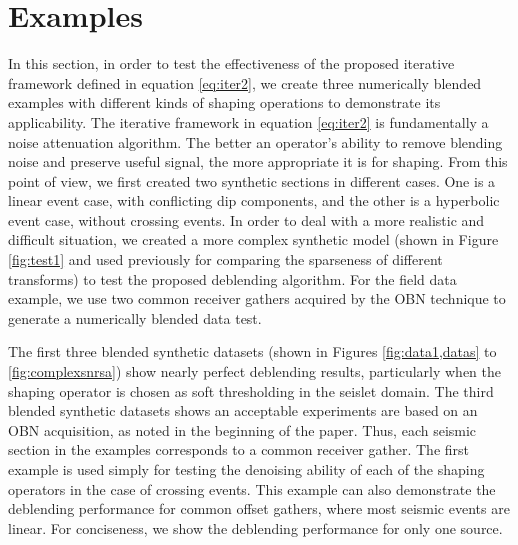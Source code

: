 
\section{Examples}
In this section, in order to test the effectiveness of the proposed iterative framework defined in equation \ref{eq:iter2}, we create three numerically blended examples with different kinds of shaping operations to demonstrate its applicability. The iterative framework in equation \ref{eq:iter2} is fundamentally a noise attenuation algorithm. The better an operator's ability to remove blending noise and preserve useful signal, the more appropriate it is for shaping. From this point of view, we first created two synthetic sections in different cases. One is a linear event case, with conflicting dip components, and the other is a hyperbolic event case, without crossing events. In order to deal with a more realistic and difficult situation, we created a more complex synthetic model (shown in Figure \ref{fig:test1} and used previously for comparing the sparseness of different transforms) to test the proposed deblending algorithm. For the field data example, we use two common receiver gathers acquired by the OBN technique to generate a numerically blended data test. 

The first three blended synthetic datasets (shown in Figures \ref{fig:data1,datas} to \ref{fig:complexsnrsa}) show nearly perfect deblending results, particularly when the shaping operator is chosen as soft thresholding in the seislet domain. The third blended synthetic datasets shows an acceptable experiments are based on an OBN acquisition, as noted in the beginning of the paper. Thus, each seismic section in the examples corresponds to a common receiver gather. The first example is used simply for testing the denoising ability of each of the shaping operators in the case of crossing events. This example can also demonstrate the deblending performance for common offset gathers, where most seismic events are linear. For conciseness, we show the deblending performance for only one source.

